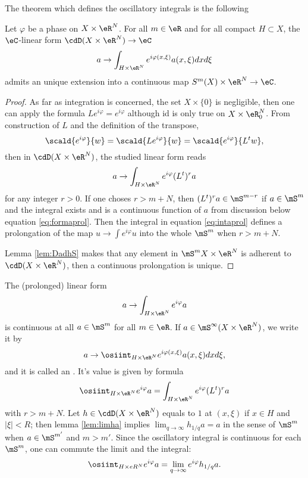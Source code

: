 The theorem which defines the oscillatory integrals is the following

\begin{theorem}
Let $\varphi$ be a phase on $X\times\eR^N$. For all $m\in\eR$ and for all compact $H\subset X$, the $\eC$-linear form $\cdD(X\times\eR^N)\to\eC$
\begin{equation}
  a\to \int_{H\times\eR^N}e^{i\varphi(x,\xi)}a(x,\xi)dxd\xi
\end{equation}
admits an unique extension into a continuous map $S^m(X)\times\eR^N\to\eC$.

\end{theorem}

\begin{proof}\label{eskdfml}
  As far as integration is concerned, the set $X\times\{ 0 \}$ is negligible, then one can apply the formula $Le^{i\varphi}=e^{i\varphi}$ although id is only true on $X\times\eR^N_0$. From construction of $L$ and the definition of the transpose,
\[ 
  \scald{e^{i\varphi}}{w}=\scald{Le^{i\varphi}}{w}=\scald{e^{i\varphi}}{L^tw},
\]
then in $\cdD(X\times\eR^N)$, the studied linear form reads
\begin{equation} \label{eq:intaprol}
   a\to\int_{H\times\eR^N}e^{i\varphi}(L^t)^ra
\end{equation}
for any integer $r>0$. If one choses $r>m+N$, then $(L^t)^ra\in\mS^{m-r}$ if $a\in\mS^m$ and the integral exists and is a continuous function of $a$ from discussion below equation \eqref{eq:formaprol}. Then the integral in equation \eqref{eq:intaprol} defines a prolongation of the map $u\to\int e^{i\varphi}u$ into the whole $\mS^m$ when $r>m+N$. 

Lemma \ref{lem:DadhS} makes that any element in $\mS^mX\times\eR^N$ is adherent to $\cdD(X\times\eR^N)$, then a continuous prolongation is unique.

\end{proof}

The (prolonged) linear form
\[ 
  a\to\int_{H\times\eR^N}e^{i\varphi}a
\]
is continuous at all $a\in\mS^m$ for all $m\in\eR$. If $a\in\mS^{\infty}(X\times\eR^N)$, we write it by
\begin{equation}
a\to \osiint_{H\times\eR^N}e^{i\varphi(x,\xi)}a(x,\xi)dxd\xi,
\end{equation}
and it is called an . It's value is given by formula
\[ 
  \osiint_{H\times\eR^N}e^{i\varphi}a=\int_{H\times\eR^N}e^{i\varphi}(L^t)^ra
\]
with $r>m+N$. Let $h\in\cdD(X\times\eR^N)$ equals to $1$ at $(x,\xi)$ if $x\in H$ and $| \xi |<R$; then lemma \ref{lem:limha} implies $\lim_{q\to\infty}h_{1/q}a=a$ in the sense of $\mS^m$ when $a\in\mS^{m'}$ and $m>m'$. Since the oscillatory integral is continuous for each $\mS^m$, one can commute the limit and the integral:
\[ 
  \osiint_{H\times\\eR^N}e^{i\varphi}a=\lim_{q\to\infty}e^{i\varphi}h_{1/q}a.
\]

